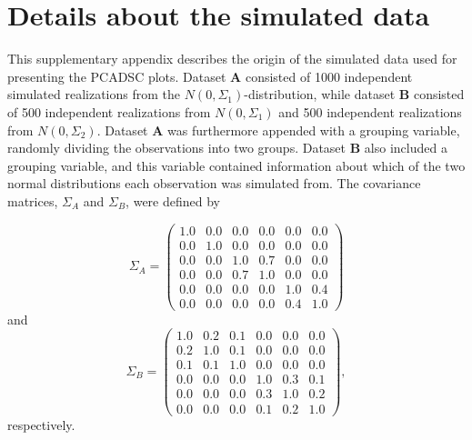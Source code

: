 \documentclass[]{interact}
\makeatletter
\theoremstyle{plain}%
\theoremstyle{definition}
\theoremstyle{remark}
\newcounter{savesection}
\newcounter{apdxsection}
\renewcommand\appendix{\par
  \setcounter{savesection}{\value{section}}%
  \setcounter{section}{\value{apdxsection}}%
  \setcounter{subsection}{0}%
  \gdef\thesection{\@Alph\c@section}}
\makeatother
\begin{document}








\appendix


\section{Details about the simulated data}
\label{appendix.simData}
This supplementary appendix describes the origin of the simulated data used for presenting the PCADSC plots. Dataset $\mathbf{A}$ consisted of 1000 independent simulated realizations from the $N(0, \Sigma_1)$-distribution, while dataset $\mathbf{B}$ consisted of 500 independent realizations from $N(0, \Sigma_1)$ and 500 independent realizations from $N(0, \Sigma_2)$. Dataset $\mathbf{A}$ was furthermore appended with a grouping variable, randomly dividing the observations into two groups. Dataset $\mathbf{B}$ also included a grouping variable, and this variable contained information about which of the two normal distributions each observation was simulated from. The covariance matrices, $\Sigma_A$ and $\Sigma_B$, were defined by

\begin{equation*}
\Sigma_A = \begin{pmatrix}
    1.0  &  0.0 & 0.0 & 0.0 & 0.0 & 0.0 \\
 0.0  &  1.0 & 0.0 & 0.0&  0.0 & 0.0 \\
 0.0   & 0.0 &  1.0 & 0.7 & 0.0 & 0.0 \\
 0.0 &  0.0 & 0.7 & 1.0 & 0.0 & 0.0 \\
0.0 &    0.0 &  0.0 & 0.0 & 1.0 & 0.4 \\
 0.0 & 0.0 &  0.0 & 0.0 & 0.4 & 1.0
\end{pmatrix}
\end{equation*}
and
\begin{equation*}
\Sigma_B = \begin{pmatrix}
 1.0 & 0.2 & 0.1 & 0.0 & 0.0 & 0.0 \\
 0.2 & 1.0 & 0.1 & 0.0 & 0.0 & 0.0 \\
 0.1 & 0.1 & 1.0 & 0.0 & 0.0 & 0.0 \\
 0.0 & 0.0 & 0.0 & 1.0 & 0.3 & 0.1 \\
 0.0 & 0.0 & 0.0 & 0.3 & 1.0 & 0.2 \\
 0.0 & 0.0 & 0.0 & 0.1 & 0.2 & 1.0
\end{pmatrix},
\end{equation*}
respectively.
\end{document}
